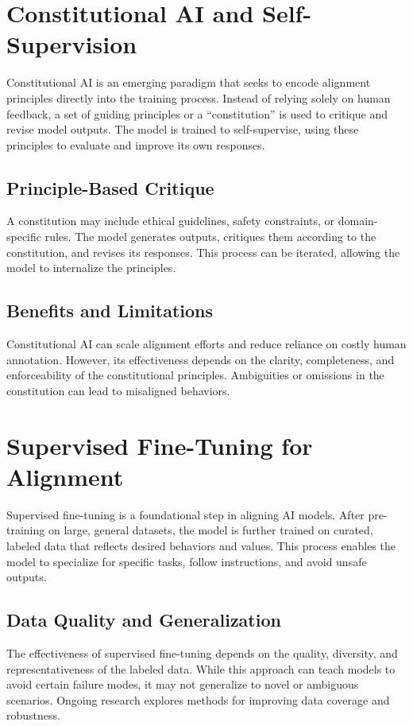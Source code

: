 \begin{TNtwocol}
\section{Constitutional AI and Self-Supervision}
Constitutional AI is an emerging paradigm that seeks to encode alignment principles directly into the training process. Instead of relying solely on human feedback, a set of guiding principles or a “constitution” is used to critique and revise model outputs. The model is trained to self-supervise, using these principles to evaluate and improve its own responses.

\subsection{Principle-Based Critique}
A constitution may include ethical guidelines, safety constraints, or domain-specific rules. The model generates outputs, critiques them according to the constitution, and revises its responses. This process can be iterated, allowing the model to internalize the principles.

\subsection{Benefits and Limitations}
Constitutional AI can scale alignment efforts and reduce reliance on costly human annotation. However, its effectiveness depends on the clarity, completeness, and enforceability of the constitutional principles. Ambiguities or omissions in the constitution can lead to misaligned behaviors.

\section{Supervised Fine-Tuning for Alignment}
Supervised fine-tuning is a foundational step in aligning AI models. After pre-training on large, general datasets, the model is further trained on curated, labeled data that reflects desired behaviors and values. This process enables the model to specialize for specific tasks, follow instructions, and avoid unsafe outputs.

\subsection{Data Quality and Generalization}
The effectiveness of supervised fine-tuning depends on the quality, diversity, and representativeness of the labeled data. While this approach can teach models to avoid certain failure modes, it may not generalize to novel or ambiguous scenarios. Ongoing research explores methods for improving data coverage and robustness.


\end{TNtwocol}
